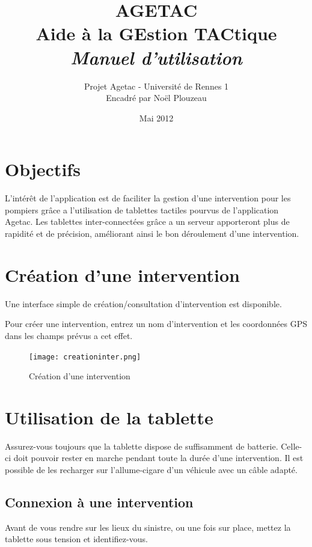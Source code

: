 \documentclass{article}
\title{\Huge{AGETAC\\
Aide à la GEstion TACtique\\}
\huge{{\color{color02} \textit{Manuel d'utilisation}}}}
\date{Mai 2012}
\author{Projet Agetac - Université de Rennes 1\\
Encadré par Noël Plouzeau}
\begin{document}
\maketitle
\vspace{1in}
\tableofcontents
\newpage
 \section{Objectifs}

L’intérêt de l’application est de faciliter la gestion d’une intervention pour les pompiers grâce a l’utilisation de tablettes tactiles pourvus de l’application Agetac. Les tablettes inter-connectées grâce a un serveur apporteront plus de rapidité et de précision, améliorant ainsi le bon déroulement d’une intervention.

\section{Création d’une intervention}

Une interface simple de création/consultation d’intervention est disponible.

Pour créer une intervention, entrez un nom d’intervention et les coordonnées GPS dans les champs prévus a cet effet.

\begin{figure}[h!]
\begin{center}
\texttt{[image: creationinter.png]}
\caption{Création d'une intervention}
\end{center}
\end{figure}

\section{Utilisation de la tablette}

Assurez-vous toujours que la tablette dispose de suffisamment de batterie. Celle-ci doit pouvoir rester en marche pendant toute la durée d’une intervention. Il est possible de les recharger sur l’allume-cigare d’un véhicule avec un câble adapté.

\subsection{Connexion à une intervention}

Avant de vous rendre sur les lieux du sinistre, ou une fois sur place, mettez la tablette sous tension et identifiez-vous.
\end{document}
